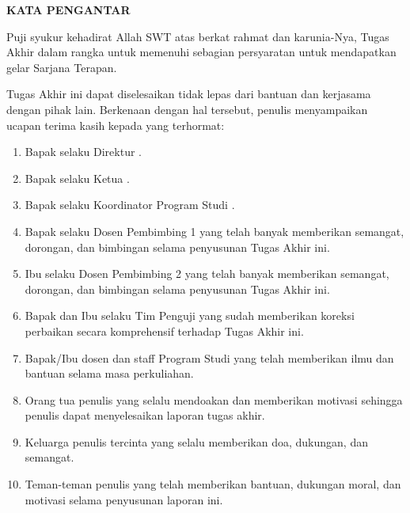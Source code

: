 
\clearpage
{}
{}
\begin{center}
    \textbf{\large KATA PENGANTAR}\\[3em]
\end{center}

Puji syukur kehadirat Allah SWT atas berkat rahmat dan karunia-Nya, Tugas Akhir dalam rangka untuk memenuhi sebagian persyaratan untuk mendapatkan gelar Sarjana Terapan.

Tugas Akhir ini dapat diselesaikan tidak lepas dari bantuan dan kerjasama dengan pihak lain. Berkenaan dengan hal tersebut, penulis menyampaikan ucapan terima kasih kepada yang terhormat:

\begin{enumerate}
    \item Bapak {\direktur} selaku Direktur {\universitas}.
    \item Bapak {\dekan} selaku Ketua {\jurusan} {\universitas}.
    \item Bapak {\koorprodi} selaku Koordinator Program Studi {\prodi} {\universitas}.
    \item Bapak {\pembimbingsatu} selaku Dosen Pembimbing 1 yang telah banyak memberikan semangat, dorongan, dan bimbingan selama penyusunan Tugas Akhir ini.
    \item Ibu {\pembimbingdua} selaku Dosen Pembimbing 2 yang telah banyak memberikan semangat, dorongan, dan bimbingan selama penyusunan Tugas Akhir ini.
    \item Bapak {\pengujisatu} dan Ibu {\pengujidua} selaku Tim Penguji yang sudah memberikan koreksi perbaikan secara komprehensif terhadap Tugas Akhir ini.
    \item Bapak/Ibu dosen dan staff Program Studi {\prodi} yang telah memberikan ilmu dan bantuan selama masa perkuliahan.
    \item Orang tua penulis yang selalu mendoakan dan memberikan motivasi sehingga penulis dapat menyelesaikan laporan tugas akhir.
    \item Keluarga penulis tercinta yang selalu memberikan doa, dukungan, dan semangat.
    \item Teman-teman penulis yang telah memberikan bantuan, dukungan moral, dan motivasi selama penyusunan laporan ini.
\end{enumerate}

